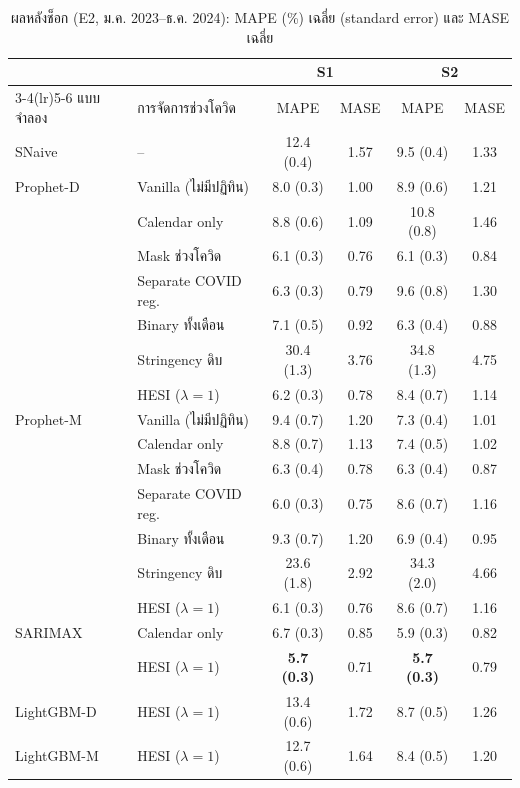 \documentclass{article}
\theoremstyle{definition}
\begin{document}
\begin{table}[t]
\centering
\caption{ผลหลังช็อก (E2, ม.ค. 2023--ธ.ค. 2024): MAPE (\%) เฉลี่ย (standard error) และ MASE เฉลี่ย}
\label{tab:e2}
\footnotesize
\begin{tabular}{llcccc}
\toprule
 & & \multicolumn{2}{c}{S1} & \multicolumn{2}{c}{S2} \\
\cmidrule(lr){3-4}\cmidrule(lr){5-6}
แบบจำลอง & การจัดการช่วงโควิด & MAPE & MASE & MAPE & MASE \\
\midrule
SNaive & -- & 12.4 (0.4) & 1.57 & 9.5 (0.4) & 1.33 \\
\midrule
Prophet-D & Vanilla (ไม่มีปฏิทิน) & 8.0 (0.3) & 1.00 & 8.9 (0.6) & 1.21 \\
 & Calendar only & 8.8 (0.6) & 1.09 & 10.8 (0.8) & 1.46 \\
 & Mask ช่วงโควิด & 6.1 (0.3) & 0.76 & 6.1 (0.3) & 0.84 \\
 & Separate COVID reg. & 6.3 (0.3) & 0.79 & 9.6 (0.8) & 1.30 \\
 & Binary ทั้งเดือน & 7.1 (0.5) & 0.92 & 6.3 (0.4) & 0.88 \\
 & Stringency ดิบ & 30.4 (1.3) & 3.76 & 34.8 (1.3) & 4.75 \\
 & HESI ($\lambda{=}1$) & 6.2 (0.3) & 0.78 & 8.4 (0.7) & 1.14 \\
\midrule
Prophet-M & Vanilla (ไม่มีปฏิทิน) & 9.4 (0.7) & 1.20 & 7.3 (0.4) & 1.01 \\
 & Calendar only & 8.8 (0.7) & 1.13 & 7.4 (0.5) & 1.02 \\
 & Mask ช่วงโควิด & 6.3 (0.4) & 0.78 & 6.3 (0.4) & 0.87 \\
 & Separate COVID reg. & 6.0 (0.3) & 0.75 & 8.6 (0.7) & 1.16 \\
 & Binary ทั้งเดือน & 9.3 (0.7) & 1.20 & 6.9 (0.4) & 0.95 \\
 & Stringency ดิบ & 23.6 (1.8) & 2.92 & 34.3 (2.0) & 4.66 \\
 & HESI ($\lambda{=}1$) & 6.1 (0.3) & 0.76 & 8.6 (0.7) & 1.16 \\
\midrule
SARIMAX & Calendar only & 6.7 (0.3) & 0.85 & 5.9 (0.3) & 0.82 \\
 & HESI ($\lambda{=}1$) & \textbf{5.7 (0.3)} & 0.71 & \textbf{5.7 (0.3)} & 0.79 \\
\midrule
LightGBM-D & HESI ($\lambda{=}1$) & 13.4 (0.6) & 1.72 & 8.7 (0.5) & 1.26 \\
\midrule
LightGBM-M & HESI ($\lambda{=}1$) & 12.7 (0.6) & 1.64 & 8.4 (0.5) & 1.20 \\
\bottomrule
\end{tabular}
\end{table}
\end{document}
